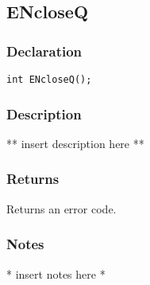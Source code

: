 \subsection{ENcloseQ}
\subsubsection{Declaration}
\begin{lstlisting}
int ENcloseQ();
\end{lstlisting}
\subsubsection{Description}
** insert description here **
\subsubsection{Returns}
Returns an error code.
\subsubsection{Notes}
* insert notes here *